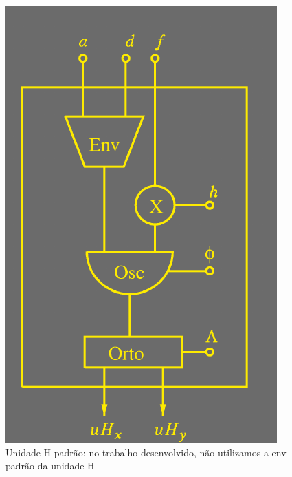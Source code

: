 \documentclass{beamer}
\begin{document}
\begin{frame}
 \begin{figure}
  \includegraphics[scale=0.3]{./images/unidadeH.png}
  \caption{Unidade H padrão: no trabalho desenvolvido, não utilizamos a env padrão
  da unidade H}
 \end{figure} 
\end{frame}
\end{document}
